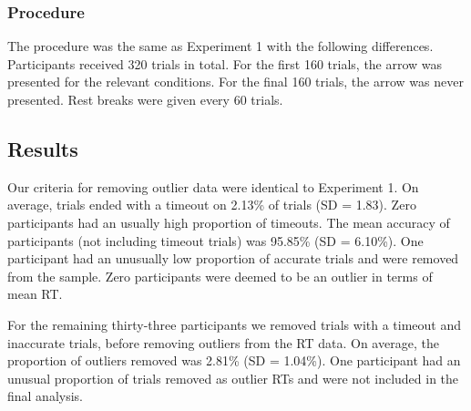 \documentclass[
  man,
  floatsintext,
  longtable,
  nolmodern,
  notxfonts,
  notimes,
  colorlinks=true,linkcolor=blue,citecolor=blue,urlcolor=blue]{apa7}
\begin{document}
\subsubsection{Procedure}\label{procedure-1}

The procedure was the same as Experiment 1 with the following
differences. Participants received 320 trials in total. For the first
160 trials, the arrow was presented for the relevant conditions. For the
final 160 trials, the arrow was never presented. Rest breaks were given
every 60 trials.

\subsection{Results}\label{results-1}

Our criteria for removing outlier data were identical to Experiment 1.
On average, trials ended with a timeout on 2.13\% of trials (SD = 1.83).
Zero participants had an usually high proportion of timeouts. The mean
accuracy of participants (not including timeout trials) was 95.85\% (SD
= 6.10\%). One participant had an unusually low proportion of accurate
trials and were removed from the sample. Zero participants were deemed
to be an outlier in terms of mean RT.

For the remaining thirty-three participants we removed trials with a
timeout and inaccurate trials, before removing outliers from the RT
data. On average, the proportion of outliers removed was 2.81\% (SD =
1.04\%). One participant had an unusual proportion of trials removed as
outlier RTs and were not included in the final analysis.
\end{document}
